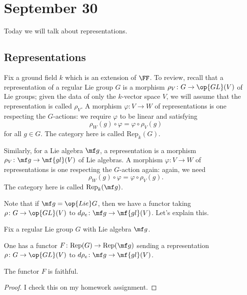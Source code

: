 \documentclass[../notes.tex]{subfiles}
\begin{document}
\section{September 30}
Today we will talk about representations.

\subsection{Representations}
Fix a ground field $k$ which is an extension of $\FF$. To review, recall that a representation of a regular Lie group $G$ is a morphism $\rho_V\colon G\to\op{GL}(V)$ of Lie groups; given the data of only the $k$-vector space $V$, we will assume that the representation is called $\rho_V$. A morphism $\varphi\colon V\to W$ of representations is one respecting the $G$-actions: we require $\varphi$ to be linear and satisfying
\[\rho_W(g)\circ\varphi=\varphi\circ\rho_V(g)\]
for all $g\in G$. The category here is called $\mathrm{Rep}_k(G)$.

Similarly, for a Lie algebra $\mf g$, a representation is a morphism $\rho_V\colon\mf g\to\mf{gl}(V)$ of Lie algebras. A morphism $\varphi\colon V\to W$ of representations is one respecting the $G$-action again: again, we need
\[\rho_W(g)\circ\varphi=\varphi\circ\rho_V(g).\]
The category here is called $\mathrm{Rep}_k(\mf g)$.

Note that if $\mf g=\op{Lie}G$, then we have a functor taking $\rho\colon G\to\op{GL}(V)$ to $d\rho_e\colon\mf g\to\mf{gl}(V)$. Let's explain this.
\begin{lemma} \label{lem:rep-theory-to-lie-alg}
	Fix a regular Lie group $G$ with Lie algebra $\mf g$.
	\begin{listalph}
		\item One has a functor $F\colon\mathrm{Rep}(G)\to\mathrm{Rep}(\mf g)$ sending a representation $\rho\colon G\to\op{GL}(V)$ to $d\rho_e\colon\mf g\to\mf{gl}(V)$.
		\item The functor $F$ is faithful.
	\end{listalph}
\end{lemma}
\begin{proof}
	I check this on my homework assignment.
\end{proof}
\end{document}
